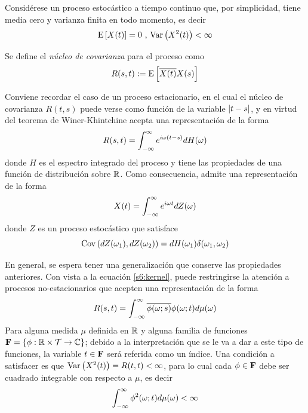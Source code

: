 Considérese un proceso estocástico a tiempo continuo \xtin{\R} que, por simplicidad, tiene media cero y varianza finita en todo momento, es decir
\begin{equation*}
\mathrm{E}\left[ X(t) \right] = 0 \text{  ,  } \mathrm{Var}\left( X^{2}(t) \right) < \infty
\end{equation*}

Se define el \textit{núcleo de covarianza} para el proceso como
\begin{equation}
R(s,t) := \mathrm{E}\left[ \overline{X(t)}X(s) \right]
\end{equation}

Conviene recordar el caso de un proceso estacionario, en el cual el núcleo de covarianza $R(t,s)$ puede verse como función de la variable $\left| t-s \right|$, y en virtud del teorema de Winer-Khintchine acepta una representación de la forma
%
\begin{equation}
R(s,t) = \int_{-\infty}^{\infty} e^{i \omega (t-s)} dH(\omega)
\label{s6:kernel}
\end{equation}
%
donde $H$ es el espectro integrado del proceso y tiene las propiedades de una función de distribución sobre $\mathbb{R}$.
%
Como consecuencia, \xtin{\R} admite una representación de la forma
\begin{equation}
X(t) = \int_{-\infty}^{\infty} e^{i\omega t} dZ(\omega)
\end{equation}
%
donde $Z$ es un proceso estocástico que satisface
\begin{equation}
\mathrm{Cov}\left( dZ(\omega_1),dZ(\omega_2) \right) = dH(\omega_1) \delta(\omega_1, \omega_2)
\end{equation}

En general, se espera tener una generalización que conserve las propiedades anteriores. Con vista a la ecuación \ref{s6:kernel}, puede restringirse la atención a procesos no-estacionarios que acepten una representación de la forma
\begin{equation}
R(s,t) = \int_{-\infty}^{\infty} \overline{\phi(\omega;s)}\phi(\omega;t) d\mu(\omega)
\label{s6:erre}
\end{equation}
%
Para alguna medida $\mu$ definida en $\mathbb{R}$ y alguna familia de funciones 
$\mathbf{F} = \left\{ \phi: \mathbb{R} \times \mathcal{T} \rightarrow \mathbb{C} \right\}$; debido a la interpretación que 
se le va a dar a este tipo de funciones, la variable $t\in \mathbf{F}$ será referida como un índice.
%
Una condición a satisfacer es que $\mathrm{Var}\left( X^{2}(t) \right) = R(t,t) < \infty$, para lo cual cada 
$\phi \in \mathbf{F}$ debe ser cuadrado integrable con respecto a $\mu$, es decir
\begin{equation}
\int_{-\infty}^{\infty} \phi^{2}(\omega;t) d\mu(\omega) < \infty
\end{equation}

